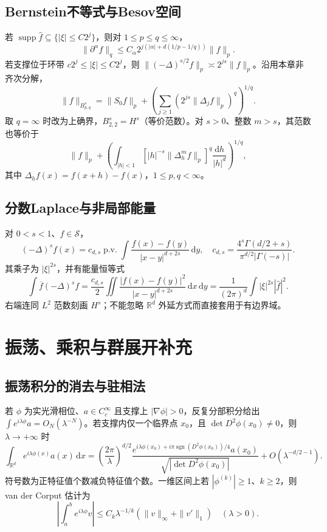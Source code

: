 \documentclass[../main.tex]{subfiles}
\begin{document}
\subsection{Bernstein不等式与Besov空间}
若 $\operatorname{supp}\widehat f\subseteq\{|\xi|\le C2^j\}$，则对 $1\le p\le q\le\infty$，
\[
\|\partial^\alpha f\|_q\le C_\alpha2^{j(|\alpha|+d(1/p-1/q))}\|f\|_p.
\]
若支撑位于环带 $c2^j\le|\xi|\le C2^j$，则 $\|(-\Delta)^{s/2}f\|_p\asymp2^{js}\|f\|_p$。沿用本章非齐次分解，
\[
\|f\|_{B^s_{p,q}}=\|S_0f\|_p+
\left(\sum_{j\ge1}(2^{js}\|\Delta_jf\|_p)^q\right)^{1/q}.
\]
取 $q=\infty$ 时改为上确界，$B^s_{2,2}=H^s$（等价范数）。对 $s>0$、整数 $m>s$，其范数也等价于
\[
\|f\|_p+\left(\int_{|h|<1}\left[|h|^{-s}\|\Delta_h^mf\|_p\right]^q\frac{\mathrm dh}{|h|^d}\right)^{1/q},
\]
其中 $\Delta_hf(x)=f(x+h)-f(x)$，$1\le p,q<\infty$。
\subsection{分数Laplace与非局部能量}
对 $0<s<1$、$f\in\mathcal S$，
\[
(-\Delta)^sf(x)=c_{d,s}\operatorname{p.v.}\int\frac{f(x)-f(y)}{|x-y|^{d+2s}}\,\mathrm dy,
\quad c_{d,s}=\frac{4^s\Gamma(d/2+s)}{\pi^{d/2}|\Gamma(-s)|}.
\]
其乘子为 $|\xi|^{2s}$，并有能量恒等式
\[
\int\overline f(-\Delta)^sf
=\frac{c_{d,s}}2\iint\frac{|f(x)-f(y)|^2}{|x-y|^{d+2s}}\,\mathrm dx\,\mathrm dy
=\frac1{(2\pi)^d}\int|\xi|^{2s}|\widehat f|^2.
\]
右端连同 $L^2$ 范数刻画 $H^s$；不能忽略 $\mathbb R^d$ 外延方式而直接套用于有边界域。
\section{振荡、乘积与群展开补充}
\subsection{振荡积分的消去与驻相法}
若 $\phi$ 为实光滑相位、$a\in C_c^\infty$ 且支撑上 $|\nabla\phi|>0$，反复分部积分给出 $\int e^{i\lambda\phi}a=O_N(\lambda^{-N})$。若支撑内仅一个临界点 $x_0$，且 $\det D^2\phi(x_0)\ne0$，则 $\lambda\to+\infty$ 时
\[
\int_{\mathbb R^d}e^{i\lambda\phi(x)}a(x)\,\mathrm dx
=\left(\frac{2\pi}\lambda\right)^{d/2}
\frac{e^{i\lambda\phi(x_0)+i\pi\operatorname{sgn}(D^2\phi(x_0))/4}a(x_0)}{\sqrt{|\det D^2\phi(x_0)|}}
+O(\lambda^{-d/2-1}).
\]
符号数为正特征值个数减负特征值个数。一维区间上若 $|\phi^{(k)}|\ge1$、$k\ge2$，则 van der Corput 估计为
\[
\left|\int_a^be^{i\lambda\phi}v\right|
\le C_k\lambda^{-1/k}(\|v\|_\infty+\|v'\|_1)\quad(\lambda>0).
\]
\end{document}
